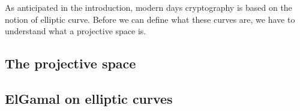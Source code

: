 \documentclass{subfiles}
\begin{document}
\label{sec:crypto-on-elliptic-curves}
    As anticipated in the introduction,
        modern days cryptography is based on the notion of elliptic curve.
        Before we can define what these curves are,
        we have to understand what a projective space is.

    \subsection{The projective space}
    

    \subsection{ElGamal on elliptic curves}
    
\end{document}
